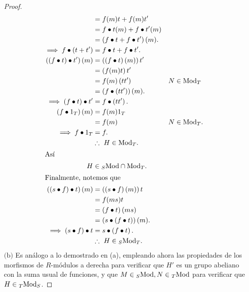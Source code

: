 \documentclass{article}
\newcommand{\lrprth}[1]{
	\left(#1\right)
}
\newcommand{\ringmod}[3]{
	\if#3l
	{}_{#1}#2
	\else
	\if#3r
	#2_{#1}
	\fi
	\fi
}
\newcommand{\ringbimod}[4]{
	\if#4l
	{}_{#1-#2}#3
	\else
	\if#4r
	#3_{#1-#2}
	\else 
	\ifstrequal{#4}{lr}{
		{}_{#1}#3_{#2}
	}
	\fi
	\fi
}
\theoremstyle{definition}
\theoremstyle{plain}
\theoremstyle{plain}
\theoremstyle{definition}
\theoremstyle{definition}
\theoremstyle{definition}
\theoremstyle{definition}
\theoremstyle{definition}
\theoremstyle{definition}
\begin{document}
\begin{enumerate}[label=\textbf{Ej \arabic*.}]
\begin{proof}
\begin{align*}
		&=f(m)t+f(m)t'\\
		&=f\bullet t(m)+ f\bullet t' (m)\\
		&=\lrprth{f\bullet t+ f\bullet t' }(m).\\
		\implies f\bullet\lrprth{t+t'}&= f\bullet t+ f\bullet t'.\\
		\lrprth{\lrprth{f\bullet t}\bullet t'}(m)&=\lrprth{\lrprth{f\bullet t}(m)}t'\\
		&=\lrprth{f(m)t}t'\\
		&=f(m)\lrprth{tt'} && N\in\ringmod{T}{\text{Mod}}{r}\\
		&=\lrprth{f\bullet\lrprth{tt'}}(m).\\
		\implies \lrprth{f\bullet t}\bullet t'&= f\bullet\lrprth{tt'}.\\
		\lrprth{f\bullet 1_T}(m)&=f(m)1_T\\
		&=f(m) && N\in\ringmod{T}{\text{Mod}}{r}.\\
		\implies f\bullet 1_T&= f.\\
		&\therefore\ H\in\ringmod{T}{\text{Mod}}{r}.\\
		\intertext{Así}
		H&\in\ringmod{S}{\text{Mod}}{l}\cap \ringmod{T}{\text{Mod}}{r}.\\
		\intertext{Finalmente, notemos que}
		\lrprth{\lrprth{s\bullet f}\bullet t}(m)&=\lrprth{\lrprth{s\bullet f}(m)}t\\
		&=f(ms)t\\
		&=\lrprth{f\bullet t}(ms)\\
		&=\lrprth{s\bullet\lrprth{f\bullet t}}(m).\\
		\implies \lrprth{s\bullet f}\bullet t&= s\bullet\lrprth{f\bullet t}.\\
		&\therefore\ H\in\ringbimod{S}{T}{\text{Mod}}{lr}.
	\end{align*} 
	$\boxed{\text{(b)}}$ Es análogo a lo demostrado en (a), empleando ahora las propiedades de los morfismos de $R$-módulos a derecha para verificar que $H'$ es un grupo abeliano con la suma usual de funciones, y que $M\in\ringmod{S}{\text{Mod}}{l}, N\in\ringmod{T}{\text{Mod}}{l}$ para verificar que $H\in\ringbimod{T}{S}{\text{Mod}}{lr}$.
\end{proof}


\end{enumerate}
\end{document}
